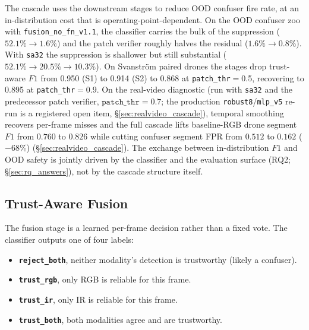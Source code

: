 The cascade uses the downstream stages to reduce OOD confuser fire rate, at an in-distribution cost that is operating-point-dependent. On the OOD confuser zoo with \texttt{fusion\_no\_fn\_v1.1}, the classifier carries the bulk of the suppression ($52.1\% \to 1.6\%$) and the patch verifier roughly halves the residual ($1.6\% \to 0.8\%$). With \texttt{sa32} the suppression is shallower but still substantial ($52.1\% \to 20.5\% \to 10.3\%$). On Svanstr\"om paired drones the stages drop trust-aware $F1$ from 0.950 (S1) to 0.914 (S2) to 0.868 at \texttt{patch\_thr}$=$0.5, recovering to 0.895 at \texttt{patch\_thr}$=$0.9. On the real-video diagnostic (run with \texttt{sa32} and the predecessor patch verifier, $\mathtt{patch\_thr}=0.7$; the production \texttt{robust8}/\texttt{mlp\_v5} re-run is a registered open item, \S\ref{sec:realvideo_cascade}), temporal smoothing recovers per-frame misses and the full cascade lifts baseline-RGB drone segment $F1$ from $0.760$ to $0.826$ while cutting confuser segment FPR from $0.512$ to $0.162$ ($-68\%$) (\S\ref{sec:realvideo_cascade}). The exchange between in-distribution $F1$ and OOD safety is jointly driven by the classifier and the evaluation surface (RQ2; \S\ref{sec:rq_answers}), not by the cascade structure itself.

\subsection{Trust-Aware Fusion}
\label{sec:trust_fusion}

The fusion stage is a learned per-frame decision rather than a fixed vote. The classifier outputs one of four labels:

\begin{itemize}
    \item \textbf{\texttt{reject\_both}}, neither modality's detection is trustworthy (likely a confuser).
    \item \textbf{\texttt{trust\_rgb}}, only RGB is reliable for this frame.
    \item \textbf{\texttt{trust\_ir}}, only IR is reliable for this frame.
    \item \textbf{\texttt{trust\_both}}, both modalities agree and are trustworthy.
\end{itemize}

